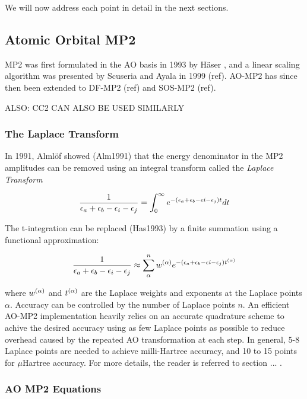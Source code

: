 We will now address each point in detail in the next sections.

\subsection{Atomic Orbital MP2}

MP2 was first formulated in the AO basis in 1993 by Häser , and a linear scaling algorithm was presented by Scuseria and Ayala in 1999 (ref). AO-MP2 has since then been extended to DF-MP2 (ref) and SOS-MP2 (ref). 

ALSO: CC2 CAN ALSO BE USED SIMILARLY

\subsubsection{The Laplace Transform}

In 1991, Almlöf showed (Alm1991) that the energy denominator in the MP2 amplitudes can be removed using an integral transform called the \emph{Laplace Transform}

\begin{equation}
\frac{1}{\epsilon_a + \epsilon_b - \epsilon_i - \epsilon_j} = \int_0^{\infty} e^{-\left(\epsilon_a + \epsilon_b - \epsilon i - \epsilon_j\right)t} dt
\end{equation}

The t-integration can be replaced (Has1993) by a finite summation using a functional approximation:

\begin{equation}
\frac{1}{\epsilon_a + \epsilon_b - \epsilon_i - \epsilon_j} \approx \sum_{\alpha}^{n} w^{(\alpha)} e^{-\left(\epsilon_a + \epsilon_b - \epsilon i - \epsilon_j\right)t^{(\alpha)}}
\end{equation} 

\noindent where $w^{(\alpha)}$ and $t^{(\alpha)}$ are the Laplace weights and exponents at the Laplace points $\alpha$. Accuracy can be controlled by the number of Laplace points $n$. An efficient AO-MP2 implementation heavily relies on an accurate quadrature scheme to achive the desired accuracy using as few Laplace points as possible to reduce overhead caused by the repeated AO transformation at each step. In general, 5-8 Laplace points are needed to achieve milli-Hartree accuracy, and 10 to 15 points for $\mu$Hartree accuracy. For more details, the reader is referred to section ... .

\subsubsection{AO MP2 Equations}

